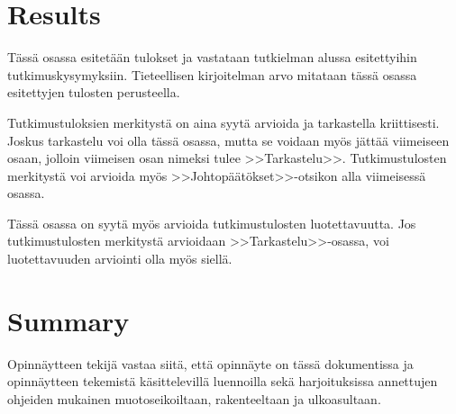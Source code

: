 \documentclass[english, 12pt, a4paper, elec, utf8, a-1b, online]{aaltothesis}
\begin{document}
\clearpage

\section{Results}

T\"ass\"a osassa esitet\"a\"an tulokset ja vastataan tutkielman alussa
esitettyihin tutkimuskysymyksiin. Tieteellisen kirjoitelman
arvo mitataan t\"ass\"a osassa esitettyjen tulosten perusteella. 

Tutkimustuloksien merkityst\"a on aina syyt\"a arvioida ja tarkastella
kriittisesti.  Joskus tarkastelu voi olla t\"ass\"a osassa, mutta se
voidaan my\"os j\"att\"a\"a viimeiseen osaan, jolloin viimeisen osan nimeksi
tulee >>Tarkastelu>>. Tutkimustulosten merkityst\"a voi arvioida my\"os
>>Johtop\"a\"at\"okset>>-otsikon alla viimeisess\"a osassa. 

T\"ass\"a osassa on syyt\"a my\"os arvioida tutkimustulosten luotettavuutta.
Jos tutkimustulosten merkityst\"a arvioidaan >>Tarkastelu>>-osassa,
voi luotettavuuden arviointi olla my\"os siell\"a. 

\clearpage

\section{Summary} 

Opinn\"aytteen tekij\"a vastaa siit\"a, ett\"a opinn\"ayte on t\"ass\"a dokumentissa
ja opinn\"aytteen tekemist\"a k\"asittelevill\"a luennoilla sek\"a
harjoituksissa annettujen ohjeiden mukainen muotoseikoiltaan,
rakenteeltaan ja ulkoasultaan.



\clearpage

\thesisbibliography
\end{document}
